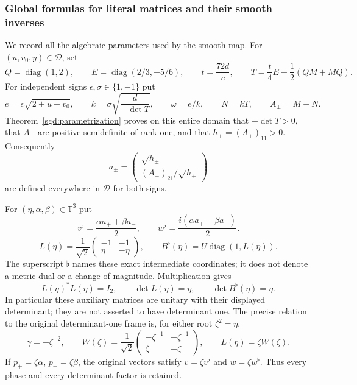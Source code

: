 \subsubsection{Global formulas for literal matrices and their smooth inverses}

We record all the algebraic parameters used by the smooth map.
For $(u,v_0,y)\in\mathcal D$, set
\[
 Q=\operatorname{diag}(1,2),\qquad E=\operatorname{diag}(2/3,-5/6),
 \qquad t=\frac{72d}{c},\qquad
 T=\frac t4E-\frac12(QM+MQ).
\]
For independent signs $\epsilon,\sigma\in\{1,-1\}$ put
\[
 e=\epsilon\sqrt{2+u+v_0},\qquad
 k=\sigma\sqrt{\frac d{-\det T}},\qquad
 \omega=e/k,\qquad N=kT,\qquad A_\pm=M\pm N.
\]
Theorem~\ref{sgd:parametrization} proves on this entire domain that
$-\det T>0$, that $A_\pm$ are positive semidefinite of rank one,
and that $h_\pm=(A_\pm)_{11}>0$. Consequently
\[
 a_\pm=\begin{pmatrix}\sqrt{h_\pm}\\
                 (A_\pm)_{21}/\sqrt{h_\pm}\end{pmatrix}
\]
are defined everywhere in $\mathcal D$ for both signs.

For $(\eta,\alpha,\beta)\in\mathbb T^3$ put
\[
v^\flat=\frac{\alpha a_++\beta a_-}{2},\qquad
w^\flat=\frac{i(\alpha a_+-\beta a_-)}{2}.
\]
\[
L(\eta)=\frac1{\sqrt2}\begin{pmatrix}-1&-1\\\eta&-\eta\end{pmatrix},
 \qquad B^\flat(\eta)=U\operatorname{diag}(1,L(\eta)).
\]
The superscript $\flat$ names these exact intermediate coordinates;
it does not denote a metric dual or a change of magnitude.
Multiplication gives
\[
 L(\eta)^*L(\eta)=I_2,\qquad
 \det L(\eta)=\eta,\qquad \det B^\flat(\eta)=\eta.
\]
In particular these auxiliary matrices are unitary with their
displayed determinant; they are not asserted to have determinant one.
The precise relation to the original determinant-one frame is,
for either root $\zeta^2=\eta$,
\[
 \gamma=-\zeta^{-2},\qquad
 W(\zeta)=\frac1{\sqrt2}
 \begin{pmatrix}-\zeta^{-1}&-\zeta^{-1}\\\zeta&-\zeta\end{pmatrix},
 \qquad L(\eta)=\zeta W(\zeta).
\]
If $p_+=\zeta\alpha$, $p_-=\zeta\beta$, the original vectors satisfy
$v=\zeta v^\flat$ and $w=\zeta w^\flat$.
Thus every phase and every determinant factor is retained.

